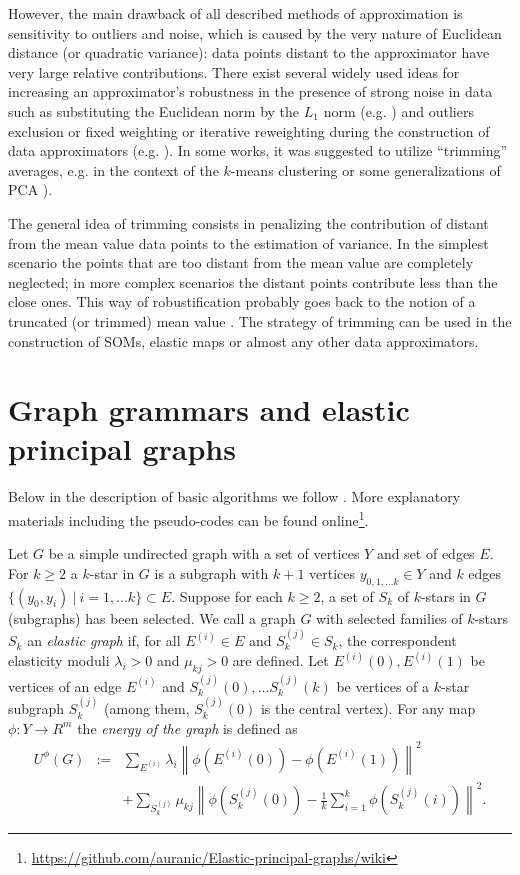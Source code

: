 \documentclass[graybox]{archivesofdatascience}
\begin{document}
However, the main drawback of all described methods of approximation is sensitivity to outliers and noise, which is caused by the very nature of Euclidean distance (or quadratic variance): data points distant to the approximator have very large relative contributions. There exist several widely used ideas for increasing an approximator's robustness in the presence of strong noise in data such as substituting the Euclidean norm by the $L_1$ norm (e.g. \citet{Ding2006, hauberg2014}) and outliers exclusion or fixed weighting or iterative reweighting during the construction of data approximators (e.g. \citet{Xu1995,allende2004robust,kohonen2001self}). In some works, it was suggested to utilize ``trimming'' averages, e.g. in the context of the $k$-means clustering or some generalizations of PCA \citet{cuesta1997,hauberg2014}).

The general idea of trimming consists in penalizing the contribution of distant from the mean value data points to the estimation of variance. In the simplest scenario the points that are too distant from the mean value are completely neglected; in more complex scenarios the distant points contribute less than the close ones. This way of robustification probably goes back to the notion of a truncated (or trimmed) mean value \citet{Huber1981}. The strategy of trimming can be used in the construction of SOMs, elastic maps or almost any other data approximators.



\section{Graph grammars and elastic principal graphs}
\label{GORBANsec:2}
Below in the description of basic algorithms we follow \citep{gorban2007topological}. More explanatory materials including the pseudo-codes can be found online\footnote{\url{https://github.com/auranic/Elastic-principal-graphs/wiki}}.

Let $G$ be a simple undirected graph with a set of vertices $Y$ and
set of edges $E$. For $k \geq 2$ a $k$-star in $G$ is a subgraph
with $k+1$ vertices $y_{0,1, \ldots k} \in Y$ and $k$ edges $\{(y_0,
y_i) \ | \ i=1,\ldots k\} \subset E$. Suppose for each $k\geq 2$, a
set of $S_k$ of $k$-stars in $G$ (subgraphs) has been selected. We call a graph
$G$ with selected families of $k$-stars $S_k$ an {\it elastic graph}
if, for all $E^{(i)} \in E $ and $S^{(j)}_k \in S_k$, the
correspondent elasticity moduli $\lambda_i > 0$ and $\mu_{kj}
> 0$ are defined. Let  $E^{(i)}(0),E^{(i)}(1)$ be vertices of an
edge $E^{(i)}$ and $S^{(j)}_k (0),\ldots S^{(j)}_k (k)$ be vertices
of a $k$-star subgraph $S^{(j)}_k $ (among them, $S^{(j)}_k (0)$ is the
central vertex).
 For any map $\phi:Y \to R^m$ the {\it energy of the
graph} is defined as
\begin{eqnarray}
U^{\phi}{(G)}&:=&\sum_{E^{(i)}} \lambda_i
\left\|\phi(E^{(i)}(0))-\phi(E^{(i)}(1)) \right\| ^2 \\ &&+
\sum_{S^{(j)}_k}\mu_{kj} \left\|\phi(S^{(j)}_k (0)) - \frac{1}{k}\sum _ {i=1}^k \phi(S^{(j)}_k
(i)) \right\|^2. \nonumber
\end{eqnarray}
\end{document}
